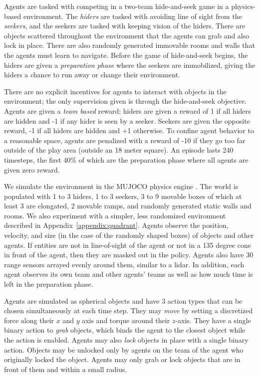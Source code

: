 \label{sec:environment}

Agents are tasked with competing in a two-team hide-and-seek game in a physics-based environment. The \textit{hiders} are tasked with avoiding line of sight from the \textit{seekers}, and the seekers are tasked with keeping vision of the hiders. There are objects scattered throughout the environment that the agents can grab and also lock in place. There are also randomly generated immovable rooms and walls that the agents must learn to navigate. Before the game of hide-and-seek begins, the hiders are given a \textit{preparation phase} where the seekers are immobilized, giving the hiders a chance to run away or change their environment.

There are no explicit incentives for agents to interact with objects in the environment; the only supervision given is through the hide-and-seek objective. Agents are given a \textit{team based} reward; hiders are given a reward of 1 if all hiders are hidden and -1 if any hider is seen by a seeker. Seekers are given the opposite reward, -1 if all hiders are hidden and +1 otherwise.
To confine agent behavior to a reasonable space, agents are penalized with a reward of -10 if they go too far outside of the play area (outside an 18 meter square).
An episode lasts 240 timesteps, the first 40\% of which are the preparation phase where all agents are given zero reward.

We simulate the environment in the MUJOCO physics engine \citep{todorov2012mujoco}. The world is populated with 1 to 3 hiders, 1 to 3 seekers, 3 to 9 movable boxes of which at least 3 are elongated, 2 movable ramps, and randomly generated static walls and rooms.
We also experiment with a simpler, less randomized environment described in Appendix~\ref{appendix:quadrant}. Agents observe the position, velocity, and size (in the case of the randomly shaped boxes) of objects and other agents. If entities are not in line-of-sight of the agent or not in a 135 degree cone in front of the agent, then they are masked out in the policy. Agents also have 30 range sensors arrayed evenly around them, similar to a lidar.
In addition, each agent observes its own team and other agents' teams as well as how much time is left in the preparation phase.

Agents are simulated as spherical objects and have 3 action types that can be chosen simultaneously at each time step. They may \textit{move} by setting a discretized force along their $x$ and $y$ axis and torque around their $z$-axis.
They have a single binary action to \textit{grab} objects, which binds the agent to the closest object while the action is enabled. Agents may also \textit{lock} objects in place with a single binary action. Objects may be unlocked only by agents on the team of the agent who originally locked the object. Agents may only grab or lock objects that are in front of them and within a small radius.